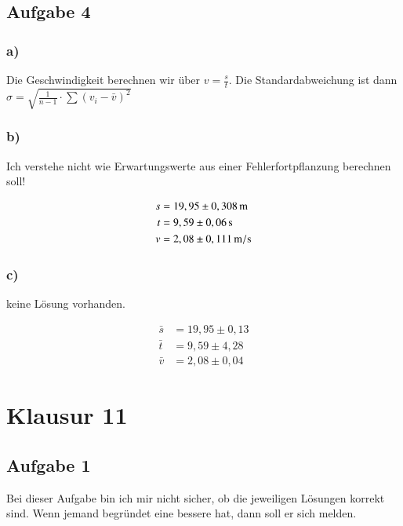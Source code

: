 \newpage

\subsection{Aufgabe 4}

\subsubsection*{a)}


Die Geschwindigkeit berechnen wir über $v = \frac{s}{t}$. Die Standardabweichung ist dann $\sigma = \sqrt{\frac{1}{n-1} \cdot \sum \left( v_i - \bar{v} \right)^2}$


\subsubsection*{b)}

Ich verstehe nicht wie Erwartungswerte aus einer Fehlerfortpflanzung berechnen soll!

\begin{align*}
s &= \unit[19,95 \pm 0,308]{m} \\
t &= \unit[9,59 \pm 0,06]{s} \\
v &= \unit[2,08 \pm 0,111]{m/s}
\end{align*}


\subsubsection*{c)}

keine Lösung vorhanden.


\begin{align*}
\bar{s} &= 19,95 \pm 0,13 \\
\bar{t} &= 9,59 \pm 4,28 \\
\bar{v} &= 2,08 \pm 0,04
\end{align*}



\section{Klausur 11}

\subsection{Aufgabe 1}

Bei dieser Aufgabe bin ich mir nicht sicher, ob die jeweiligen Lösungen korrekt sind. Wenn jemand begründet eine bessere hat, dann soll er sich melden.

